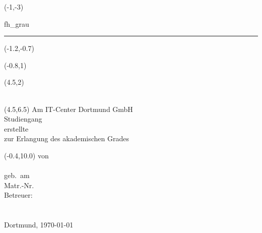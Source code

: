 
\begin{titlepage}
		
  \begin{textblock}{6.5}(-1,-3)
    \begin{color}{fh_grau}
      \rule{7cm}{33cm}    
    \end{color}
  \end{textblock}
  \begin{textblock}{6.5}(-1.2,-0.7)
  \end{textblock}
  \begin{textblock}{6.5}(-0.8,1)
    {\Large \textsf{\thedockind}}            
  \end{textblock}

  \begin{textblock}{7}(4.5,2)
    {\noindent \huge 
      \textsf{\textbf{\thetitle\\[0.3cm] 
          \Large  \thesubtitle\\[0.05cm]
          }} }
  \end{textblock}


  \begin{textblock}{6}(4.5,6.5)\noindent
    \textsf{Am IT-Center Dortmund GmbH\\
    Studiengang \themajor \\
    erstellte \thedockind \\
    zur Erlangung des akademischen Grades\\
    \thedegree}
  \end{textblock}

  \begin{textblock}{6.5}(-0.4,10.0)
    \noindent
    \textsf{von \\
      \theauthor \\
      geb.\ am \thebirthday  \\
      Matr.-Nr. \thematriculationnumber\\[0.7cm]
      Betreuer:\\
       \noindent\hspace*{6mm} \thebetreuer \\
       \noindent\hspace*{6mm} \thezweitbetreuer\\ [0.5cm]
      Dortmund, \today}    
  \end{textblock}
	

\end{titlepage}



